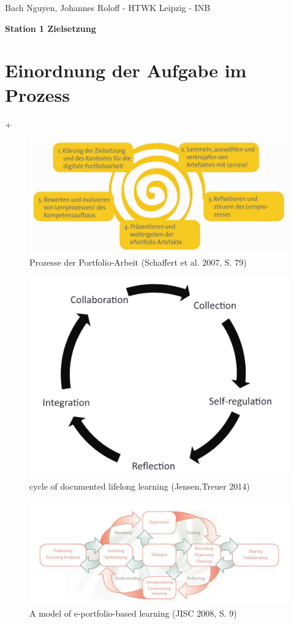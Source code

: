 \documentclass[a4paper,oneside]{scrarticle}
\begin{document}
	\begin{flushleft}
		Bach Nguyen, Johannes Roloff - HTWK Leipzig - INB
	\end{flushleft}
	\begin{center}
		\begin{LARGE}
			\textbf{Station 1 Zielsetzung}
		\end{LARGE}
	\end{center}
	\section*{Einordnung der Aufgabe im Prozess}
	+\begin{figure} [h]
		\centering
		\includegraphics[width=0.7\linewidth]{e-portfolio-prozesse-schaffert}
		\caption{Prozesse der Portfolio-Arbeit (Schaffert et al. 2007, S. 79)}
		\label{fig:e-portfolio-prozesse-schaffert}
	\end{figure}
	\begin{figure}[h]
		\centering
		\includegraphics[width=0.5\linewidth]{cycle-of-documented-lifelong-learning-Jensen}
		\caption{cycle of documented lifelong learning (Jensen,Treuer 2014)}
		\label{fig:cycle-of-documented-lifelong-learning-jensen}
	\end{figure}
	\begin{figure}[h]
		\centering
		\includegraphics[width=0.8\linewidth]{model-of-e-portfolio-based-learning}
		\caption{A model of e-portfolio-based learning (JISC 2008, S. 9)}
		\label{fig:model-of-e-portfolio-based-learning}
	\end{figure}
	\pagebreak 
	
\end{document}
